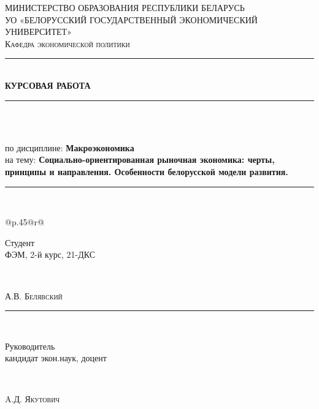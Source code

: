 \documentclass[14pt,a4paper]{article}
\newenvironment{linez}
{\trivlist\nopagebreak
\parindent0pt
\item\relax\obeylines}
{\par
\vspace{3pt}%
\endtrivlist}
\begin{document}
    \begin{titlepage}
        \newcommand{\HRule}{\rule{\linewidth}{0mm}}
        \center
        \textsc{\Large МИНИСТЕРСТВО ОБРАЗОВАНИЯ РЕСПУБЛИКИ БЕЛАРУСЬ}\\[0cm]
        \renewcommand{\baselinestretch}{1.5}
        \textsc{\Large УО «БЕЛОРУССКИЙ ГОСУДАРСТВЕННЫЙ ЭКОНОМИЧЕСКИЙ УНИВЕРСИТЕТ»}\\[2cm]
        \textsc{ Кафедра экономической политики}\\[0.5cm]
        \HRule\\[1cm]
        {\bfseries КУРСОВАЯ РАБОТА}\\[0.4cm]
        \HRule\\[0cm]
        \begin{linez}
            \\ по дисциплине: {\bfseries Макроэкономика}
            \\ на тему: {\bfseries Социально-ориентированная рыночная экономика: черты, принципы и направления. Особенности белорусской модели развития.}
        \end{linez}
        \HRule\\[2cm]

        \begin{minipage}{0.4\textwidth}
            \begin{flushleft}
                \begin{tabular*}{\textwidth}{@{}p{.45\textwidth}@{\extracolsep{\fill}}r@{}}
                    \raggedright
                    \large{Студент}
                    \vspace{-5pt}
                    \\ФЭМ, 2-й курс, 21-ДКС
                \end{tabular*}
            \end{flushleft}
        \end{minipage}
        ~
        \begin{minipage}{0.4\textwidth}
            \begin{flushleft}
                \hspace{1.5cm}
                А.В. \textsc{Белявский}
            \end{flushleft}
        \end{minipage}
        \HRule\\[0.5cm]
        \begin{minipage}{0.4\textwidth}
            \begin{flushleft}
                \large{Руководитель}\\
                \vspace{-5pt}
                кандидат экон.наук, доцент
            \end{flushleft}
        \end{minipage}
        ~
        \begin{minipage}{0.4\textwidth}
            \begin{flushleft}
                \hspace{1.5cm}
                A.Д. \textsc{Якутович}
            \end{flushleft}
        \end{minipage}


\end{titlepage}
\end{document}
